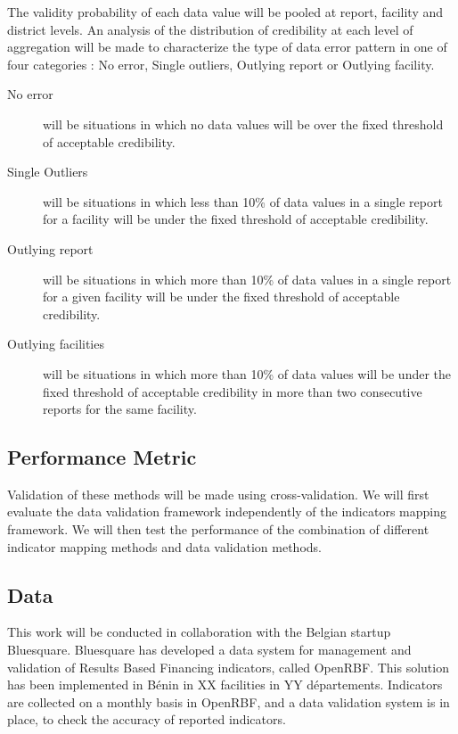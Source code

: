 The validity probability of each data value will be pooled at report, facility and district levels. An analysis of the distribution of credibility at each level of aggregation will be made to characterize the type of data error pattern in one of four categories : No error, Single outliers, Outlying report or Outlying facility.
\begin{description}
	\item[No error] will be situations in which no data values will be over the fixed threshold of acceptable credibility.
	\item[Single Outliers] will be situations in which less than 10\% of data values in a single report for a facility will be under the fixed threshold of acceptable credibility.
	\item[Outlying report] will be situations in which more than 10\% of data values in a single report for a given facility will be under the fixed threshold of acceptable credibility.
	\item[Outlying facilities] will be situations in which more than 10\% of data values will be under the fixed threshold of acceptable credibility in more than two consecutive reports for the same facility.
\end{description}

\subsection{Performance Metric}

Validation of these methods will be made using cross-validation. We will first evaluate the data validation framework independently of the indicators mapping framework. We will then test the performance of the combination of different indicator mapping methods and data validation methods.

\subsection{Data}
\label{paper2_data}

This work will be conducted in collaboration with the Belgian startup Bluesquare. Bluesquare has developed a data system for management and validation of Results Based Financing indicators, called OpenRBF. This solution has been implemented in Bénin in XX facilities in YY départements. Indicators are collected on a monthly basis in OpenRBF, and a data validation system is in place, to check the accuracy of reported indicators.

